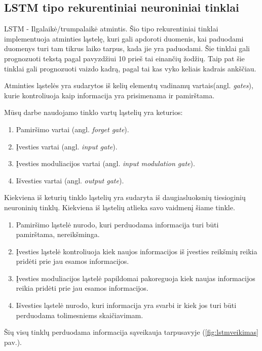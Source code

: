 \subsection{ LSTM tipo rekurentiniai neuroniniai tinklai}

LSTM - Ilgalaikė/trumpalaikė atmintis. Šio tipo rekurentiniai tinklai implementuoja atminties ląstelę, kuri gali apdoroti duomenis, kai paduodami duomenys turi tam tikrus laiko tarpus, kada jie yra paduodami. Šie tinklai gali prognozuoti tekstą pagal pavyzdžiui 10 prieš tai einančių žodžių. Taip pat šie tinklai gali prognozuoti vaizdo kadrą, pagal tai kas vyko keliais kadrais ankščiau. \cite{Christopher2015}

Atminties ląstelės yra sudarytos iš kelių elementų vadinamų vartais(angl. \textit{gates}), kurie kontroliuoja kaip informacija yra prisimenama ir pamirštama.

Mūsų darbe naudojamo tinklo vartų ląstelių yra keturios:
\begin{enumerate}
  \item Pamiršimo vartai (angl. \textit{forget gate}).
  \item Įvesties vartai (angl. \textit{input gate}).
  \item Įvesties moduliacijos vartai (angl. \textit{input modulation gate}).
  \item Išvesties vartai (angl. \textit{output gate}).
\end{enumerate}

Kiekviena iš keturių tinklo ląstelių yra sudaryta iš daugiasluoksnių tiesioginių neuroninių tinklų. Kiekviena iš ląstelių atlieka savo vaidmenį šiame tinkle.

\begin{enumerate}
  \item Pamiršimo ląstelė nurodo, kuri perduodama informacija turi būti pamirštama, nereikšminga.
  \item Įvesties ląstelė kontroliuoja kiek naujos informacijos iš įvesties reikšmių reikia pridėti prie jau esamos informacijos.
  \item Įvesties moduliacijos ląstelė papildomai pakoreguoja kiek naujas informacijos reikia pridėti prie jau esamos informacijos.
  \item Išvesties ląstelė nurodo, kuri informacija yra svarbi ir kiek jos turi būti perduodama tolimesniems skaičiavimam.
\end{enumerate}

Šių visų tinklų perduodama informacija sąveikauja tarpusavyje (\ref{fig:lstmveikimas} pav.).

